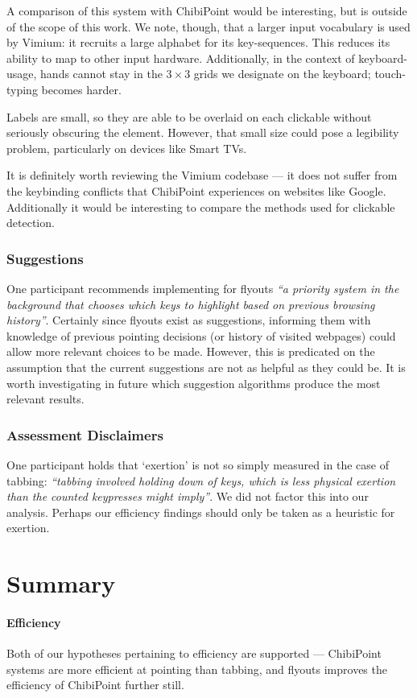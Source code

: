 \documentclass[11pt,openright,a4paper]{report}
\begin{document}
A comparison of this system with ChibiPoint would be interesting, but is outside of the scope of this work. We note, though, that a larger input vocabulary is used by Vimium: it recruits a large alphabet for its key-sequences. This reduces its ability to map to other input hardware. Additionally, in the context of keyboard-usage, hands cannot stay in the $3\times3$ grids we designate on the keyboard; touch-typing becomes harder.

Labels are small, so they are able to be overlaid on each clickable without seriously obscuring the element. However, that small size could pose a legibility problem, particularly on devices like Smart TVs.

It is definitely worth reviewing the Vimium codebase --- it does not suffer from the keybinding conflicts that ChibiPoint experiences on websites like Google. Additionally it would be interesting to compare the methods used for clickable detection.
\subsubsection{Suggestions}
One participant recommends implementing for flyouts \textit{``a priority system in the background that chooses which keys to highlight based on previous browsing history''}. Certainly since flyouts exist as suggestions, informing them with knowledge of previous pointing decisions (or history of visited webpages) could allow more relevant choices to be made. However, this is predicated on the assumption that the current suggestions are not as helpful as they could be. It is worth investigating in future which suggestion algorithms produce the most relevant results.

\subsubsection{Assessment Disclaimers}
One participant holds that `exertion' is not so simply measured in the case of tabbing: \textit{``tabbing involved holding down of keys, which is less physical exertion than the counted keypresses might imply''}. We did not factor this into our analysis. Perhaps our efficiency findings should only be taken as a heuristic for exertion.

\section{Summary}
\paragraph{Efficiency}
Both of our hypotheses pertaining to efficiency are supported --- ChibiPoint systems are more efficient at pointing than tabbing, and flyouts improves the efficiency of ChibiPoint further still.
\end{document}

